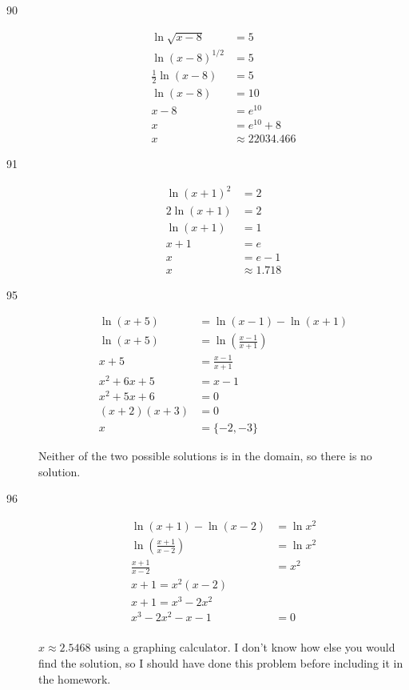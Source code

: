 \documentclass[fleqn,addpoints]{exam}
\begin{document}
\begin{description}
\item[90]
\begin{align*}
  \ln \sqrt{x-8} &= 5 \\
  \ln (x-8)^{1/2} &= 5 \\
  \frac{1}{2} \ln (x-8) &= 5 \\
  \ln (x-8) &= 10 \\
  x-8 &= e^{10} \\
  x &= e^{10} + 8\\
  x &\approx 22034.466
\end{align*}

\item[91]
\begin{align*}
  \ln (x+1)^2 &= 2 \\
  2 \ln (x+1) &= 2 \\
  \ln (x+1) &= 1 \\
  x+1 &= e \\
  x &= e - 1\\
  x &\approx 1.718
\end{align*}

\item[95]
\begin{align*}
  \ln(x+5) &= \ln(x-1) - \ln(x+1) \\
  \ln(x+5) &= \ln \left( \frac{x-1}{x+1} \right) \\
  x+5 &= \frac{x-1}{x+1} \\
  x^2 + 6x + 5 &= x-1 \\
  x^2 + 5x + 6 &= 0 \\
  (x+2)(x+3) &= 0 \\
  x &= \{-2, -3\}
\end{align*}

Neither of the two possible solutions is in the domain, so there is no solution.

\item[96]
\begin{align*}
  \ln(x+1) - \ln(x-2) &= \ln x^2 \\
  \ln \left( \frac{x+1}{x-2} \right) &= \ln x^2 \\
  \frac{x+1}{x-2} &= x^2 \\
  x+1 = x^2(x-2) \\
  x+1 = x^3-2x^2 \\
  x^3 -2x^2 - x - 1 &= 0 \\
\end{align*}

$x \approx 2.5468$ using a graphing calculator.  I don't know how else you would find the solution, so I should have done this
problem before including it in the homework. 


\end{description}
\end{document}
